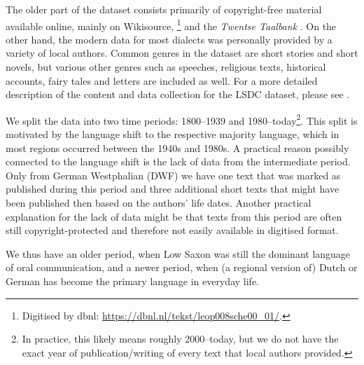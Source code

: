 \documentclass[output=paper,colorlinks,citecolor=brown]{langscibook}
\begin{document}
The older part of the dataset consists primarily of copyright-free material available online, mainly on Wikisource, \citet{LeopoldLeopold1882}\footnote{Digitised by dbnl: \url{https://dbnl.nl/tekst/leop008sche00_01/}.} and the \textit{Twentse Taalbank} \citep{vanderVliet2021}. On the other hand, the modern data for most dialects was personally provided by a variety of local authors. Common genres in the dataset are short stories and short novels, but various other genres such as speeches, religious texts, historical accounts, fairy tales and letters are included as well. For a more detailed description of the content and data collection for the LSDC dataset, please see \citet{SiewertEtAl2020}. 

We split the data into two time periods: 1800--1939 and 1980--today\footnote{In practice, this likely means roughly 2000--today, but we do not have the exact year of publication/writing of every text that local authors provided.}. This split is motivated by the language shift to the respective majority language, which in most regions occurred between the 1940s and 1980s. %
A practical reason possibly connected to the language shift is the lack of data from the intermediate period. Only from German Westphalian (DWF) we have one text that was marked as published during this period and three additional short texts that might have been published then based on the authors' life dates. Another practical explanation for the lack of data might be that texts from this period are often still copyright-protected and therefore not easily available in digitised format. 

We thus have an older period, when Low Saxon was still the dominant language of oral communication, and a newer period, when (a regional version of) Dutch or German has become the primary language in everyday life.


\end{document}
